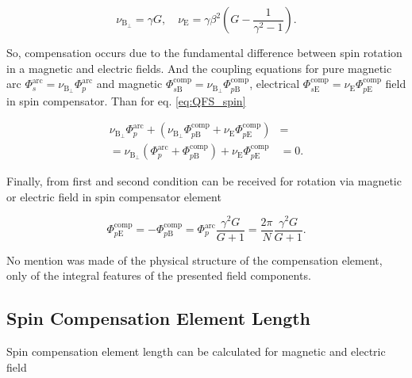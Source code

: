 \documentclass[a4paper,
               keeplastbox,   %
               ]{jacow}
\begin{document}
\begin{equation}
	\nu_{\mathrm{B}_{\perp}} = \gamma G, \quad \nu_{\mathrm{E}} = \gamma \beta^2 \left(G-\frac{1}{\gamma^{2}-1}\right).
	\label{eq:spin-tine}
\end{equation} 

\noindent So, compensation occurs due to the fundamental difference between spin rotation in a magnetic and electric fields. And the coupling equations for pure magnetic arc $\Phi_{s}^{\text{arc}} = \nu_{\mathrm{B}_{\perp}}\Phi_{p}^{\text{arc}}$ and magnetic $\Phi_{s\mathrm{B}}^{\text{comp}} = \nu_{\mathrm{B}_{\perp}}\Phi_{p\mathrm{B}}^{\text{comp}}$, electrical $\Phi_{s\mathrm{E}}^{\text{comp}} = \nu_{\mathrm{E}}\Phi_{p\mathrm{E}}^{\text{comp}}$ field in spin compensator. Than for eq. \ref{eq:QFS_spin}

\begin{equation}
	\begin{aligned}
		\nu_{\mathrm{B}_{\perp}}\Phi_{p}^{\text{arc}} +
		\left(\nu_{\mathrm{B}_{\perp}}\Phi_{p\mathrm{B}}^{\text{comp}} +
		\nu_{\mathrm{E}}\Phi_{p\mathrm{E}}^{\text{comp}} \right) & = \\
		= \nu_{\mathrm{B}_{\perp}} \left( 
		\Phi_{p}^{\text{arc}} +
		\Phi_{p\mathrm{B}}^{\text{comp}} \right) +
		\nu_{\mathrm{E}}\Phi_{p\mathrm{E}}^{\text{comp}}  & = 0.
		\label{eq:deflection}
	\end{aligned}
\end{equation}

\par Finally, from first and second condition can be received for rotation via magnetic or electric field in spin compensator element

\begin{equation}
	\Phi_{p\mathrm{E}}^{\textrm{comp}} = - \Phi_{p\mathrm{B}}^{\textrm{comp}} = {\Phi}_{p}^{\text{arc}}\frac{\gamma^2 G}{G+1} =\frac{2\pi}{N}\frac{\gamma^2 G}{G+1}.
	\label{eq:deflection}
\end{equation}

\noindent No mention was made of the physical structure of the compensation element, only of the integral features of the presented field components.

\subsection{Spin Compensation Element Length}

Spin compensation element length can be calculated for magnetic and electric field
\end{document}
